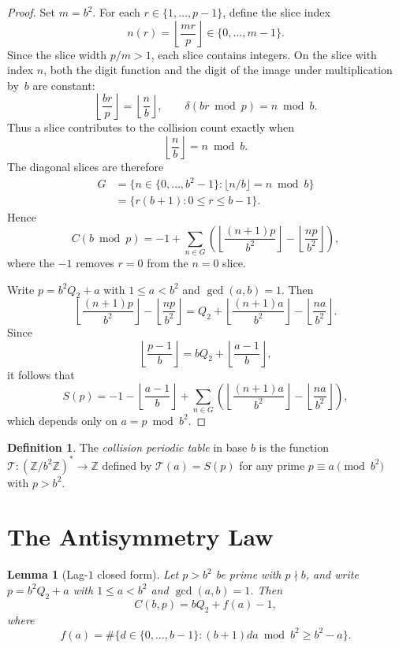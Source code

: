 \documentclass[12pt]{amsart}
\newtheorem{lemma}[theorem]{Lemma}
\theoremstyle{definition}
\newtheorem{definition}[theorem]{Definition}
\theoremstyle{remark}
\begin{document}
\begin{proof}
Set $m=b^2$. For each $r \in \{1,\dots,p-1\}$, define the
slice index
\[
n(r)=\left\lfloor \frac{mr}{p}\right\rfloor
\in \{0,\dots,m-1\}.
\]
Since the slice width $p/m>1$, each slice contains
integers. On the slice with index $n$, both the digit
function and the digit of the image under multiplication
by~$b$ are constant:
\[
\left\lfloor \frac{br}{p}\right\rfloor
= \left\lfloor \frac{n}{b}\right\rfloor,
\qquad
\delta(br \bmod p)= n \bmod b.
\]
Thus a slice contributes to the collision count exactly
when
\[
\left\lfloor \frac{n}{b}\right\rfloor = n \bmod b.
\]
The diagonal slices are therefore
\begin{align*}
G &= \bigl\{n \in \{0,\dots,b^2{-}1\} :
\lfloor n/b\rfloor = n \bmod b\bigr\} \\
&= \{r(b{+}1) : 0 \le r \le b{-}1\}.
\end{align*}
Hence
\[
C(b \bmod p)
= -1 + \sum_{n \in G}
\left(
\left\lfloor \frac{(n+1)p}{b^2}\right\rfloor
- \left\lfloor \frac{np}{b^2}\right\rfloor
\right),
\]
where the $-1$ removes $r=0$ from the $n=0$ slice.

Write $p=b^2Q_2+a$ with $1\le a<b^2$ and $\gcd(a,b)=1$.
Then
\[
\left\lfloor \frac{(n+1)p}{b^2}\right\rfloor
- \left\lfloor \frac{np}{b^2}\right\rfloor
= Q_2 + \left\lfloor \frac{(n+1)a}{b^2}\right\rfloor
- \left\lfloor \frac{na}{b^2}\right\rfloor.
\]
Since
\[
\left\lfloor \frac{p-1}{b}\right\rfloor
= bQ_2 + \left\lfloor \frac{a-1}{b}\right\rfloor,
\]
it follows that
\[
S(p)= -1 - \left\lfloor \frac{a-1}{b}\right\rfloor
+ \sum_{n\in G}
\left(
\left\lfloor \frac{(n+1)a}{b^2}\right\rfloor
- \left\lfloor \frac{na}{b^2}\right\rfloor
\right),
\]
which depends only on $a=p \bmod b^2$.
\end{proof}

\begin{definition}
The \emph{collision periodic table} in base $b$ is the function
$\mathcal{T} \colon (\mathbb{Z}/b^2\mathbb{Z})^{*}
\to \mathbb{Z}$ defined by $\mathcal{T}(a) = S(p)$ for
any prime $p \equiv a \pmod{b^2}$ with $p > b^2$.
\end{definition}

\section{The Antisymmetry Law}

\begin{lemma}[Lag-$1$ closed form]\label{lem:closed}
Let $p>b^2$ be prime with $p\nmid b$, and write
$p=b^2Q_2+a$ with $1\le a<b^2$ and $\gcd(a,b)=1$.
Then
\[
C(b,p)=bQ_2+f(a)-1,
\]
where
\[
f(a)=\#\{d\in\{0,\dots,b-1\} :
(b+1)da \bmod b^2 \ge b^2-a\}.
\]
\end{lemma}
\end{document}
